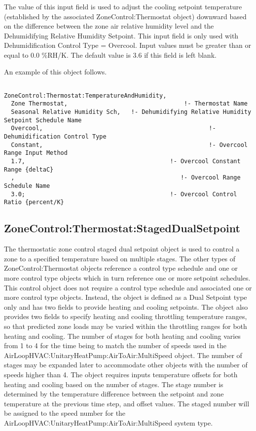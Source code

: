 The value of this input field is used to adjust the cooling setpoint temperature (established by the associated ZoneControl:Thermostat object) downward based on the difference between the zone air relative humidity level and the Dehumidifying Relative Humidity Setpoint. This input field is only used with Dehumidification Control Type = Overcool. Input values must be greater than or equal to 0.0 \%RH/K. The default value is 3.6 if this field is left blank.

An example of this object follows.

\begin{lstlisting}

ZoneControl:Thermostat:TemperatureAndHumidity,
  Zone Thermostat,                                 !- Thermostat Name
  Seasonal Relative Humidity Sch,   !- Dehumidifying Relative Humidity Setpoint Schedule Name
  Overcool,                                               !- Dehumidification Control Type
  Constant,                                               !- Overcool Range Input Method
  1.7,                                         !- Overcool Constant Range {deltaC}
  ,                                               !- Overcool Range Schedule Name
  3.0;                                         !- Overcool Control Ratio {percent/K}
\end{lstlisting}

\subsection{ZoneControl:Thermostat:StagedDualSetpoint}\label{zonecontrolthermostatstageddualsetpoint}

The thermostatic zone control staged dual setpoint object is used to control a zone to a specified temperature based on multiple stages. The other types of ZoneControl:Thermostat objects reference a control type schedule and one or more control type objects which in turn reference one or more setpoint schedules. This control object does not require a control type schedule and associated one or more control type objects. Instead, the object is defined as a Dual Setpoint type only and has two fields to provide heating and cooling setpoints. The object also provides two fields to specify heating and cooling throttling temperature ranges, so that predicted zone loads may be varied within the throttling ranges for both heating and cooling. The number of stages for both heating and cooling varies from 1 to 4 for the time being to match the number of speeds used in the AirLoopHVAC:UnitaryHeatPump:AirToAir:MultiSpeed object. The number of stages may be expanded later to accommodate other objects with the number of speeds higher than 4. The object requires inputs temperature offsets for both heating and cooling based on the number of stages. The stage number is determined by the temperature difference between the setpoint and zone temperature at the previous time step, and offset values. The staged number will be assigned to the speed number for the AirLoopHVAC:UnitaryHeatPump:AirToAir:MultiSpeed system type.

